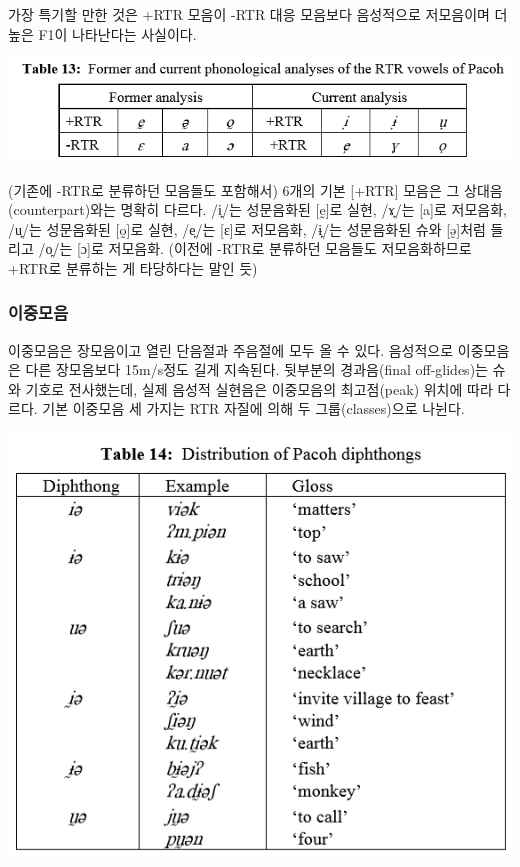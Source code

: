 가장 특기할 만한 것은 +RTR 모음이 -RTR 대응 모음보다 음성적으로 저모음이며 더 높은 F1이 나타난다는 사실이다.

\includegraphics{Pacoh/src/PacohTable13.png}

(기존에 -RTR로 분류하던 모음들도 포함해서) 6개의 기본 [+RTR] 모음은 그 상대음(counterpart)와는 명확히 다르다.
/i̙/는 성문음화된 [ḛ]로 실현, /ɤ̙/는 [a]로 저모음화, /u̙/는 성문음화된 [o̰]로 실현, /e̙/는 [ɛ]로 저모음화, /ɨ̙/는 성문음화된 슈와 [ə̰]처럼 들리고 /o̙/는 [ɔ]로 저모음화.
(이전에 -RTR로 분류하던 모음들도 저모음화하므로 +RTR로 분류하는 게 타당하다는 말인 듯)

\subsubsection{이중모음}
이중모음은 장모음이고 열린 단음절과 주음절에 모두 올 수 있다. 음성적으로 이중모음은 다른 장모음보다 15m/s정도 길게 지속된다. 뒷부분의 경과음(final off-glides)는 슈와 기호로 전사했는데, 실제 음성적 실현음은 이중모음의 최고점(peak) 위치에 따라 다르다. 기본 이중모음 세 가지는 RTR 자질에 의해 두 그룹(classes)으로 나뉜다.

\includegraphics{Pacoh/src/PacohTable14.png}

